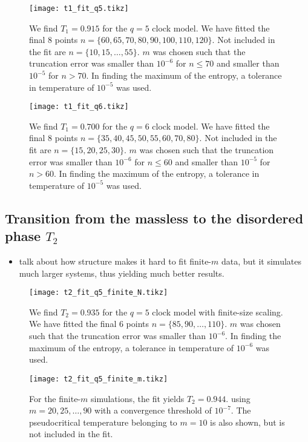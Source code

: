 
\begin{figure}
  \centering
  \texttt{[image: t1\_fit\_q5.tikz]}
  \caption{We find $T_1 = 0.915$ for the $q = 5$ clock model.
  We have fitted the final 8 points $n = \{ 60, 65, 70, 80, 90,
  100, 110, 120 \}$. Not included in the fit are $n = \{ 10, 15, \dots, 55 \}$.
  $m$ was chosen such that the truncation error was smaller than $10^{-6}$ for $n \leq 70$ and smaller than $10^{-5}$
  for $n > 70$.
  In finding the maximum of the entropy, a tolerance in temperature of $10^{-5}$ was used.
  }\label{figure:t1_fit_q5}
\end{figure}

\begin{figure}
  \centering
  \texttt{[image: t1\_fit\_q6.tikz]}
  \caption{We find $T_1 = 0.700$ for the $q = 6$ clock model.
  We have fitted the final 8 points $n = \{ 35, 40, 45, 50, 55,
  60, 70, 80 \}$.
  Not included in the fit are $n = \{ 15, 20, 25, 30 \}$.
  $m$ was chosen such that the truncation error was smaller than $10^{-6}$ for $n \leq 60$ and smaller than $10^{-5}$
  for $n > 60$.
  In finding the maximum of the entropy, a tolerance in temperature of $10^{-5}$ was used.
  }\label{figure:t1_fit_q6}
\end{figure}

\subsection{Transition from the massless to the disordered phase $T_2$}

\begin{itemize}
  \item talk about how structure makes it hard to fit finite-$m$ data, but it simulates much larger systems,
  thus yielding much better results.
\end{itemize}

\begin{figure}
  \centering
  \texttt{[image: t2\_fit\_q5\_finite\_N.tikz]}
  \caption{We find $T_2 = 0.935$ for the $q = 5$ clock model with finite-size scaling.
  We have fitted the final 6 points $n = \{ 85, 90, \dots, 110 \}$.
  $m$ was chosen such that the truncation error was smaller than $10^{-6}$.
  In finding the maximum of the entropy, a tolerance in temperature of $10^{-6}$ was used.}
  \label{figure:t2_fit_q5_finite_N}
\end{figure}

\begin{figure}
  \centering
  \texttt{[image: t2\_fit\_q5\_finite\_m.tikz]}
  \caption{
  For the finite-$m$ simulations, the fit yields $T_2 = 0.944$.
  using $m = 20, 25, \dots,
  90$ with a convergence threshold of $10^{-7}$.
  The pseudocritical temperature belonging to $m = 10$ is also shown,
  but is not included in the fit.}\label{figure:t2_fit_q5_finite_m}
\end{figure}

